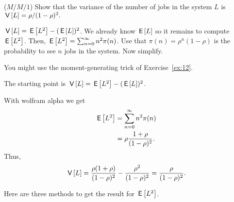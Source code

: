\begin{exercise}($M/M/1$)
Show that the variance of the number of jobs in the system $L$ is
$\,\mathsf{V}\left[L\right] = \rho/(1-\rho)^2.$
  \begin{hint}
    $\,\mathsf{V}\left[L\right] = \,\mathsf{E}\left[L^2\right] - (\,\mathsf{E}\left[L\right])^2$. We already know $\,\mathsf{E}\left[L\right]$ so it remains
    to compute $\,\mathsf{E}\left[L^2\right]$. Then, $\,\mathsf{E}\left[L^2 \right]= \sum_{n=0}^\infty n^2 \pi(n)$. Use that $\pi(n)=\rho^n(1-\rho)$ is the probability to see $n$ jobs in the system. Now simplify.    

You might use the moment-generating trick of Exercise~\ref{ex:12}.
  \end{hint}
  \begin{solution}
The starting point is  $\,\mathsf{V}\left[L\right] = \,\mathsf{E}\left[L^2\right] - (\,\mathsf{E}\left[L\right])^2$. 

With wolfram alpha we get
    \begin{equation*}
      \begin{split}
      \,\mathsf{E}\left[L^2 \right]
&= \sum_{n=0}^\infty n^2 \pi(n) \\
&= \rho \frac{1+\rho}{(1-\rho)^2}.
      \end{split}
    \end{equation*}
    Thus,
\begin{equation*}
\,\mathsf{V}\left[L\right] = \frac{\rho(1+\rho)}{(1-\rho)^2}-\frac{\rho^2}{(1-\rho)^2} = \frac{\rho}{(1-\rho)^2}.
\end{equation*}

Here are three methods to get the result for $\,\mathsf{E}\left[L^2\right]$.  


\end{solution}
\end{exercise}
